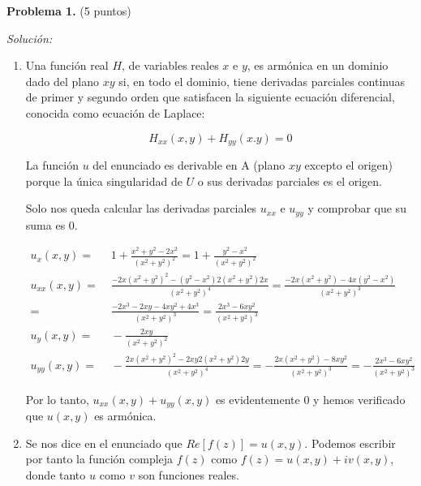 \textbf{Problema 1.} (5 puntos)

\vspace{20px}
\textit{Solución:}
\\

\begin{enumerate}
[label=\alph*)]
    \item Una función real $H$, de variables reales $x$ e $y$, es armónica en un dominio dado del plano $xy$ si,
    en todo el dominio,
    tiene derivadas parciales continuas de primer y segundo orden que satisfacen la siguiente ecuación diferencial, conocida
    como ecuación de Laplace:

    \begin{equation*}
        H_{xx}(x,y) + H_{yy}(x.y) = 0
    \end{equation*}

    La función $u$ del enunciado es derivable en A (plano $xy$ excepto el origen) porque la única singularidad de $U$ o sus
    derivadas parciales es el origen.

    Solo nos queda calcular las derivadas parciales $u_{xx}$ e $u_{yy}$ y comprobar que su suma es 0.

    \begin{align*}
        u_{x}(x,y) = & \;1 + \frac{x^2 + y^2 - 2x^2}{(x^2 + y^2)^2} = 1 + \frac{y^2 - x^2}{(x^2 + y^2)^2} \\[20pt]
        u_{xx}(x,y) = & \;\frac{-2x(x^2 + y^2)^2 - (y^2 - x^2)2(x^2 + y^2)2x}{(x^2 + y^2)^4} =
        \frac{-2x(x^2 + y^2) - 4x(y^2 - x^2)}{(x^2 + y^2)^3}  \\
        = & \; \frac{-2x^3 -2xy -4xy^2 + 4x^3}{(x^2 + y^2)^3} =
        \frac{2x^3 - 6xy^2}{(x^2 + y^2)^3} \\[20pt]
        u_{y}(x,y) = & \; - \frac{2xy}{(x^2 + y^2)^2} \\[20pt]
        u_{yy}(x,y) = & \; - \frac{2x(x^2 + y^2)^2 - 2xy2(x^2+y^2)2y}{(x^2 + y^2)^4}
        = - \frac{2x(x^2 + y^2) - 8xy^2}{(x^2 + y^2)^3} = - \frac{2x^3 - 6xy^2}{(x^2+y^2)^3}
    \end{align*}

    Por lo tanto, $u_{xx}(x,y) + u_{yy}(x,y)$ es evidentemente $0$ y hemos verificado que $u(x,y)$ es armónica.


    \vspace{20px}
    \item Se nos dice en el enunciado que $Re[f(z)] = u(x,y)$. Podemos escribir por tanto la función compleja $f(z)$ como $f(z) = u(x,y) + iv(x,y)$,
    donde tanto $u$ como $v$ son funciones reales.


\end{enumerate}

